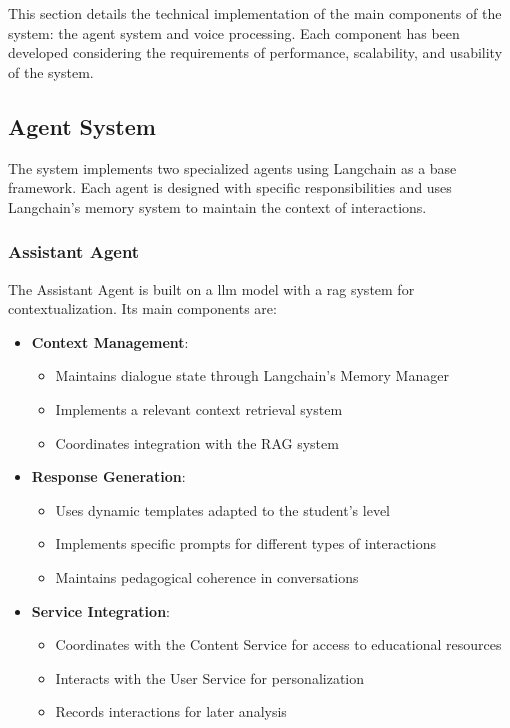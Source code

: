 This section details the technical implementation of the main components of the system: the agent system and voice processing. Each component has been developed considering the requirements of performance, scalability, and usability of the system.

\subsection{Agent System}
\label{implementacion-agentes}

The system implements two specialized agents using Langchain as a base framework. Each agent is designed with specific responsibilities and uses Langchain's memory system to maintain the context of interactions.

\subsubsection{Assistant Agent}

The Assistant Agent is built on a \gls{llm} model with a \gls{rag} system for contextualization. Its main components are:

\begin{itemize}
    \item \textbf{Context Management}:
    \begin{itemize}
        \item Maintains dialogue state through Langchain's Memory Manager
        \item Implements a relevant context retrieval system
        \item Coordinates integration with the RAG system
    \end{itemize}

    \item \textbf{Response Generation}:
    \begin{itemize}
        \item Uses dynamic templates adapted to the student's level
        \item Implements specific prompts for different types of interactions
        \item Maintains pedagogical coherence in conversations
    \end{itemize}

    \item \textbf{Service Integration}:
    \begin{itemize}
        \item Coordinates with the Content Service for access to educational resources
        \item Interacts with the User Service for personalization
        \item Records interactions for later analysis
    \end{itemize}
\end{itemize}

